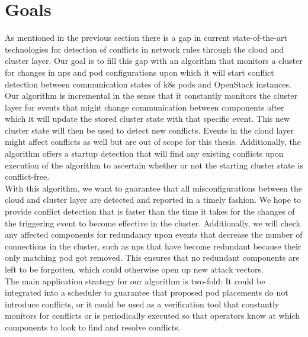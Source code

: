 \section{Goals} \label{sec:goals}
As mentioned in the previous section there is a gap in current state-of-the-art technologies for detection of conflicts in network rules through the cloud and cluster layer. Our goal is to fill this gap with an algorithm that monitors a cluster for changes in \acrshort{np}s and pod configurations upon which it will start conflict detection between communication states of \acrshort{k8s} pods and OpenStack instances. Our algorithm is incremental in the sense that it constantly monitors the cluster layer for events that might change communication between components after which it will update the stored cluster state with that specific event. This new cluster state will then be used to detect new conflicts. Events in the cloud layer might affect conflicts as well but are out of scope for this thesis. Additionally, the algorithm offers a startup detection that will find any existing conflicts upon execution of the algorithm to ascertain whether or not the starting cluster state is conflict-free.
\\[10pt]

With this algorithm, we want to guarantee that all misconfigurations between the cloud and cluster layer are detected and reported in a timely fashion. We hope to provide conflict detection that is faster than the time it takes for the changes of the triggering event to become effective in the cluster. Additionally, we will check any affected components for redundancy upon events that decrease the number of connections in the cluster, such as \acrshort{np}s that have become redundant because their only matching pod got removed. This ensures that no redundant components are left to be forgotten, which could otherwise open up new attack vectors.
\\[10pt]

The main application strategy for our algorithm is two-fold: It could be integrated into a scheduler to guarantee that proposed pod placements do not introduce conflicts, or it could be used as a verification tool that constantly monitors for conflicts or is periodically executed so that operators know at which components to look to find and resolve conflicts.


